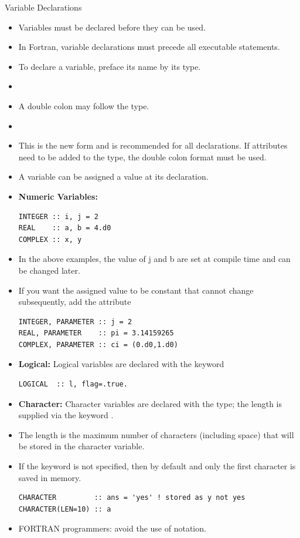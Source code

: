 \documentclass[10pt,t]{beamer}
\begin{document}
\begin{frame}{Variable Declarations}
  \begin{itemize}
    \item Variables must be declared before they can be used.
    \item In Fortran, variable declarations must precede all executable statements.
    \item To declare a variable, preface its name by its type.
    \item[] 
    \item A double colon may follow the type.
    \item[] 
    \item This is the new form and is recommended for all declarations. If attributes need to be added to the type, the double colon format must be used.
    \item A variable can be assigned a value at its declaration.
    \framebreak
    \item \textbf{Numeric Variables:}
      \begin{lstlisting}[language={[90]Fortran}]
INTEGER :: i, j = 2
REAL    :: a, b = 4.d0
COMPLEX :: x, y 
      \end{lstlisting}
    \item In the above examples, the value of j and b are set at compile time and can be changed later.
    \item If you want the assigned value to be constant that cannot change subsequently, add the attribute 
      \begin{lstlisting}[language={[90]Fortran}]
INTEGER, PARAMETER :: j = 2
REAL, PARAMETER    :: pi = 3.14159265
COMPLEX, PARAMETER :: ci = (0.d0,1.d0)
      \end{lstlisting}
    \item \textbf{Logical:} Logical variables are declared with the  keyword
      \begin{lstlisting}[language={[90]Fortran}]
LOGICAL  :: l, flag=.true.
      \end{lstlisting}
    \item \textbf{Character:} Character variables are declared with the  type; the length is supplied via the keyword .
    \item The length is the maximum number of characters (including space) that will be stored in the character variable.
    \item If the  keyword is not specified, then by default  and only the first character is saved in memory. 
      \begin{lstlisting}[language={[90]Fortran}]
CHARACTER         :: ans = 'yes' ! stored as y not yes
CHARACTER(LEN=10) :: a
      \end{lstlisting}
    \item FORTRAN programmers: avoid the use of  notation.
  \end{itemize}
\end{frame}
\end{document}
